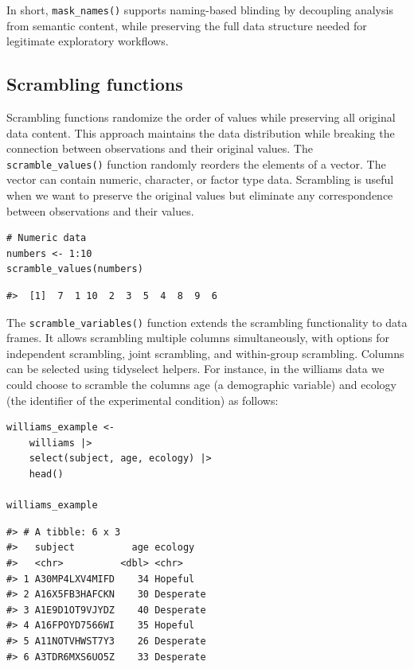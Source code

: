In short, \texttt{mask\_names()} supports naming-based blinding by decoupling analysis from semantic content, while preserving the full data structure needed for legitimate exploratory workflows.

\subsection{Scrambling functions}\label{scrambling-functions}

Scrambling functions randomize the order of values while preserving all original data content. This approach maintains the data distribution while breaking the connection between observations and their original values. The \texttt{scramble\_values()} function randomly reorders the elements of a vector. The vector can contain numeric, character, or factor type data. Scrambling is useful when we want to preserve the original values but eliminate any correspondence between observations and their values.

\begin{verbatim}
# Numeric data
numbers <- 1:10
scramble_values(numbers)
\end{verbatim}

\begin{verbatim}
#>  [1]  7  1 10  2  3  5  4  8  9  6
\end{verbatim}

The \texttt{scramble\_variables()} function extends the scrambling functionality to data frames. It allows scrambling multiple columns simultaneously, with options for independent scrambling, joint scrambling, and within-group scrambling. Columns can be selected using tidyselect helpers. For instance, in the williams data we could choose to scramble the columns age (a demographic variable) and ecology (the identifier of the experimental condition) as follows:

\begin{verbatim}
williams_example <-
    williams |>
    select(subject, age, ecology) |> 
    head()

williams_example
\end{verbatim}

\begin{verbatim}
#> # A tibble: 6 x 3
#>   subject          age ecology  
#>   <chr>          <dbl> <chr>    
#> 1 A30MP4LXV4MIFD    34 Hopeful  
#> 2 A16X5FB3HAFCKN    30 Desperate
#> 3 A1E9D1OT9VJYDZ    40 Desperate
#> 4 A16FPOYD7566WI    35 Hopeful  
#> 5 A11NOTVHWST7Y3    26 Desperate
#> 6 A3TDR6MXS6UO5Z    33 Desperate
\end{verbatim}

